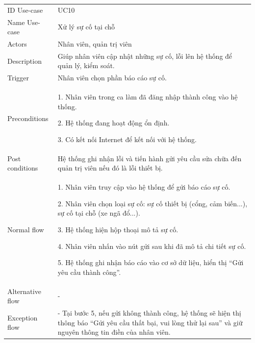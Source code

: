 \begin{center}
    \begin{tabular}{|m{2.5cm}|m{13cm}|}
    \hline
        ID Use-case  & UC10 \\ 
        Name Use-case & Xử lý sự cố tại chỗ \\ 
    \hline
        Actors & Nhân viên, quản trị viên \\
    \hline
        Description & Giúp nhân viên cập nhật những sự cố, lỗi lên hệ thống để quản lý, kiểm soát. \\
    \hline
        Trigger & Nhân viên chọn phần báo cáo sự cố. \\
    \hline
        Preconditions & 
        1. Nhân viên trong ca làm đã đăng nhập thành công vào hệ thống.
        
        2. Hệ thống đang hoạt động ổn định.
        
        3. Có kết nối Internet để kết nối với hệ thống. \\
    \hline
        Post conditions & Hệ thống ghi nhận lỗi và tiến hành gửi yêu cầu sửa chữa đến quản trị viên nếu đó là lỗi thiết bị. \\
    \hline
        Normal flow & 
        1. Nhân viên truy cập vào hệ thống để gửi báo cáo sự cố.
        
        2. Nhân viên chọn loại sự cố: sự cố thiết bị (cổng, cảm biến...), sự cố tại chỗ (xe ngã đổ...).
        
        3. Hệ thống hiện hộp thoại mô tả sự cố.
        
        4. Nhân viên nhấn vào nút gửi sau khi đã mô tả chi tiết sự cố.
        
        5. Hệ thống ghi nhận báo cáo vào cơ sở dữ liệu, hiển thị “Gửi yêu cầu thành công”. \\
    \hline
        Alternative flow & - \\ 
    \hline
        Exception flow & 
        - Tại bước 5, nếu gửi không thành công, hệ thống sẽ hiện thị thông báo “Gửi yêu cầu thất bại, vui lòng thử lại sau” và giữ nguyên thông tin điền của nhân viên. \\
    \hline
    \end{tabular}
\end{center}